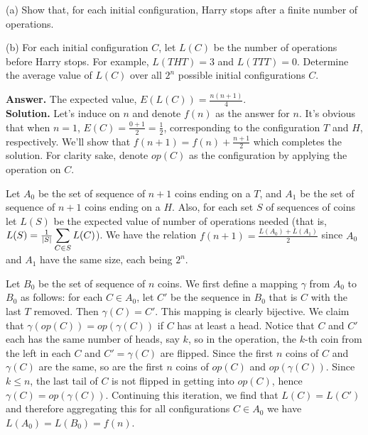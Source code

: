 \documentclass[11pt,a4paper]{article}
\begin{document}
\begin{enumerate}
	(a) Show that, for each initial configuration, Harry stops after a finite number of operations.
	
	(b) For each initial configuration $C$, let $L(C)$ be the number of operations before Harry stops. For example, $L(THT) = 3$ and $L(TTT) = 0$. Determine the average value of $L(C)$ over all $2^n$ possible initial configurations $C$.
	
	\textbf{Answer.} The expected value, $E(L(C))=\frac{n(n+1)}{4}$. \\
	\textbf{Solution.} Let's induce on $n$ and denote $f(n)$ as the answer for $n$. It's obvious that when $n=1$, $E(C)=\frac{0+1}{2}=\frac 12$, corresponding to the configuration $T$ and $H$, respectively. We'll show that $f(n+1)=f(n)+\frac{n+1}{2}$ which completes the solution. 
	For clarity sake, denote $op(C)$ as the configuration by applying the operation on $C$. 
	
	Let $A_0$ be the set of sequence of $n+1$ coins ending on a $T$, and $A_1$ be the set of sequence of $n+1$ coins ending on a $H$. Also, for each set $S$ of sequences of coins let $L(S)$ be the expected value of number of operations needed (that is, $L(S)=\frac{1}{|S|}\displaystyle\sum_{C\in S}L(C)$). 
	We have the relation $f(n+1)=\frac{L(A_0)+L(A_1)}{2}$ since $A_0$ and $A_1$ have the same size, each being $2^n$. 
	
	Let $B_0$ be the set of sequence of $n$ coins. We first define a mapping $\gamma$ from $A_0$ to $B_0$ as follows: for each $C\in A_0$, let $C'$ be the sequence in $B_0$ that is $C$ with the last $T$ removed. Then $\gamma(C)=C'$. This mapping is clearly bijective. We claim that $\gamma(op(C))=op(\gamma(C))$ if $C$ has at least a head. Notice that $C$ and $C'$ each has the same number of heads, say $k$, so in the operation, the $k$-th coin from the left in each $C$ and $C'=\gamma(C)$ are flipped. 
	Since the first $n$ coins of $C$ and $\gamma(C)$ are the same, so are the first $n$ coins of $op(C)$ and $op(\gamma(C))$. Since $k\le n$, the last tail of $C$ is not flipped in getting into $op(C)$, hence $\gamma(C)=op(\gamma(C))$. 
	Continuing this iteration, we find that $L(C)=L(C')$ and therefore aggregating this for all configurations $C\in A_0$ we have $L(A_0)=L(B_0)=f(n)$. 
	

\end{enumerate}
\end{document}
